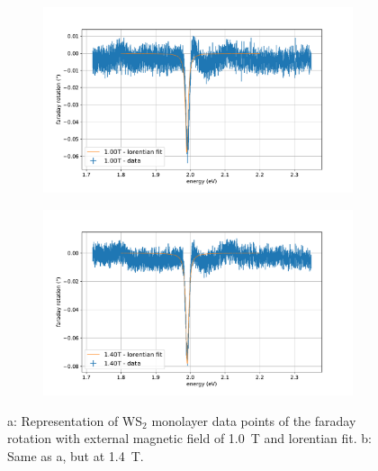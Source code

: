 \begin{figure}[!ht]
    \centering
    \begin{subfigure}{0.47\textwidth}
        \centering
        \includegraphics[width=1.0\textwidth]{plots/WS2_1000mT.pdf}
    \caption{}
    \end{subfigure}
    \begin{subfigure}{0.47\textwidth}
        \centering
        \includegraphics[width=\textwidth]{plots/WS2_1400mT.pdf}
        \caption{}
    \end{subfigure}
    \caption{a: Representation of WS$_2$ monolayer data points of the faraday rotation with external magnetic field of \SI{1.0}{\tesla} and lorentian fit. b: Same as a, but at \SI{1.4}{\tesla}.} %
\end{figure}
